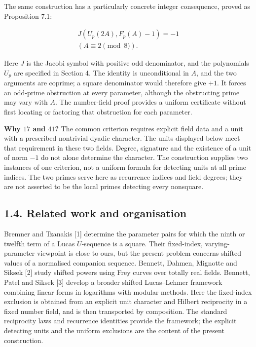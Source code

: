 \documentclass[11pt,a4paper]{article}
\begin{document}
The same construction has a particularly concrete integer consequence,
proved as Proposition 7.1:

\[
\begin{gathered}
\boxed{J\!\left(U_p(2A),F_p(A)-1\right)=-1}\\
(A\equiv2\pmod8).
\end{gathered}
\tag{1.10}
\]

Here \(J\) is the Jacobi symbol with positive odd denominator, and the
polynomials \(U_p\) are specified in Section 4. The identity is
unconditional in \(A\), and the two arguments are coprime; a square
denominator would therefore give \(+1\). It forces an odd-prime
obstruction at every parameter, although the obstructing prime may vary
with \(A\). The number-field proof provides a uniform certificate
without first locating or factoring that obstruction for each parameter.

\textbf{Why \(17\) and \(41\)?} The common criterion requires explicit
field data and a unit with a prescribed nontrivial dyadic character. The
units displayed below meet that requirement in these two fields. Degree,
signature and the existence of a unit of norm \(-1\) do not alone
determine the character. The construction supplies two instances of one
criterion, not a uniform formula for detecting units at all prime
indices. The two primes serve here as recurrence indices and field
degrees; they are not asserted to be the local primes detecting every
nonsquare.

\subsection{1.4. Related work and organisation}\label{related-work}

Bremner and Tzanakis {[}1{]} determine the parameter pairs for which the
ninth or twelfth term of a Lucas \(U\)-sequence is a square. Their
fixed-index, varying-parameter viewpoint is close to ours, but the
present problem concerns shifted values of a normalised companion
sequence. Bennett, Dahmen, Mignotte and Siksek {[}2{]} study shifted
powers using Frey curves over totally real fields. Bennett, Patel and
Siksek {[}3{]} develop a broader shifted Lucas--Lehmer framework
combining linear forms in logarithms with modular methods. Here the
fixed-index exclusion is obtained from an explicit unit character and
Hilbert reciprocity in a fixed number field, and is then transported by
composition. The standard reciprocity laws and recurrence identities
provide the framework; the explicit detecting units and the uniform
exclusions are the content of the present construction.
\end{document}
